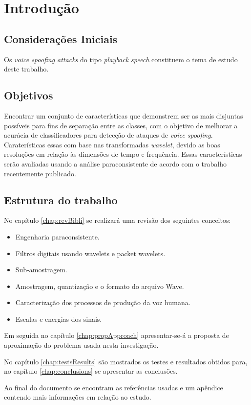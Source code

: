 \chapter{Introdução}
	\section{Considerações Iniciais}
		\par Os \textit{voice spoofing attacks} do tipo \textit{playback speech} constituem o tema de estudo deste trabalho.
						 
	\section{Objetivos}
		\par Encontrar um conjunto de características que demonstrem ser as mais disjuntas possíveis para fins de separação entre as classes, com o objetivo de melhorar a acurácia de classificadores para detecção de ataques de \textit{voice spoofing}. Caraterísticas essas com base nas transformadas \textit{wavelet}, devido as boas resoluções em relação às dimensões de tempo e frequência. Essas características serão avaliadas usando a análise paraconsistente de acordo com o trabalho \cite{8588433} recentemente publicado.
			
	\section{Estrutura do trabalho}
		\par No capítulo \ref{chap:revBibli} se realizará uma revisão dos seguintes conceitos:
		\begin{itemize}
			\item Engenharia paraconsistente.
			\item Filtros digitais usando wavelets e packet wavelets.
			\item Sub-amostragem.
			\item Amostragem, quantização e o formato do arquivo Wave.
			\item Caracterização dos processos de produção da voz humana.
			\item Escalas e energias dos sinais.
		\end{itemize}
		\par Em seguida no capítulo \ref{chap:propApproach} apresentar-se-á a proposta de aproximação do problema usada nesta investigação. 
		\par No capítulo \ref{chap:testsResults} são mostrados os testes e resultados obtidos para, no capítulo \ref{chap:conclusions} se apresentar as conclusões.
		\par Ao final do documento se encontram as referências usadas e um apêndice contendo mais informações em relação ao estudo.